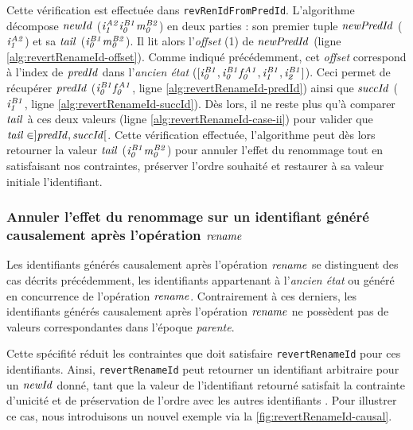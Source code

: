 Cette vérification est effectuée dans \texttt{revRenIdFromPredId}.
L'algorithme décompose $\mathit{newId}$ (\eg $\mathit{i}^{\mathit{A2}}_{\mathit{1}}\mathit{i}^{\mathit{B1}}_{\mathit{0}}\mathit{m}^{\mathit{B2}}_{\mathit{0}}$) en deux parties : son premier tuple $\mathit{newPredId}$ ($\mathit{i}^{\mathit{A2}}_{\mathit{1}}$) et sa $\mathit{tail}$ ($\mathit{i}^{\mathit{B1}}_{\mathit{0}}\mathit{m}^{\mathit{B2}}_{\mathit{0}}$).
Il lit alors l'\emph{offset} (1) de $\mathit{newPredId}$ (ligne \ref{alg:revertRenameId-offset}).
Comme indiqué précédemment, cet \emph{offset} correspond à l'index de $\mathit{predId}$ dans l'\emph{ancien état} ($[\mathit{i}^{\mathit{B1}}_{\mathit{0}},\mathit{i}^{\mathit{B1}}_{\mathit{0}}\mathit{f}^{\mathit{A1}}_{\mathit{0}},\mathit{i}^{\mathit{B1}}_{\mathit{1}},\mathit{i}^{\mathit{B1}}_{\mathit{2}}]$).
Ceci permet de récupérer $\mathit{predId}$ ($\mathit{i}^{\mathit{B1}}_{\mathit{0}}\mathit{f}^{\mathit{A1}}_{\mathit{0}}$, ligne \ref{alg:revertRenameId-predId}) ainsi que $\mathit{succId}$ ($\mathit{i}^{\mathit{B1}}_{\mathit{1}}$, ligne \ref{alg:revertRenameId-succId}).
Dès lors, il ne reste plus qu'à comparer $\mathit{tail}$ à ces deux valeurs (ligne \ref{alg:revertRenameId-case-ii}) pour valider que $\mathit{tail} \in ]\mathit{predId},\mathit{succId}[$.
Cette vérification effectuée, l'algorithme peut dès lors retourner la valeur $\mathit{tail}$ ($\mathit{i}^{\mathit{B1}}_{\mathit{0}}\mathit{m}^{\mathit{B2}}_{\mathit{0}}$) pour annuler l'effet du renommage tout en satisfaisant nos contraintes, \ie préserver l'ordre souhaité et restaurer à sa valeur initiale l'identifiant.

\subsubsection{Annuler l'effet du renommage sur un identifiant généré causalement après l'opération $\mathit{rename}$}

Les identifiants générés causalement après l'opération $\mathit{rename}$ se distinguent des cas décrits précédemment, \ie les identifiants appartenant à l'\emph{ancien état} ou généré en concurrence de l'opération $\mathit{rename}$.
Contrairement à ces derniers, les identifiants générés causalement après l'opération $\mathit{rename}$ ne possèdent pas de valeurs correspondantes dans l'époque \emph{parente}.

Cette spécifité réduit les contraintes que doit satisfaire \texttt{revertRenameId} pour ces identifiants.
Ainsi, \texttt{revertRenameId} peut retourner un identifiant arbitraire pour un $\mathit{newId}$ donné, tant que la valeur de l'identifiant retourné satisfait la contrainte d'unicité  et de préservation de l'ordre avec les autres identifiants .
Pour illustrer ce cas, nous introduisons un nouvel exemple via la \autoref{fig:revertRenameId-causal}.

